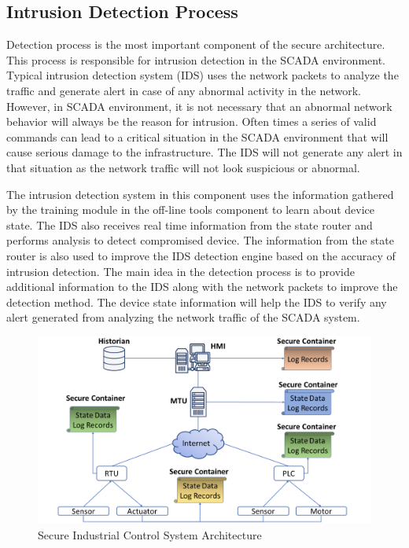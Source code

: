 \documentclass[conference]{IEEEtran}
\begin{document}
\subsection{Intrusion Detection Process}
Detection process is the most important component of the secure architecture. This process is responsible for intrusion detection in the SCADA environment. Typical intrusion detection system (IDS) uses the network packets to analyze the traffic and generate alert in case of any abnormal activity in the network. However, in SCADA environment, it is not necessary that an abnormal network behavior will always be the reason for intrusion. Often times a series of valid commands can lead to a critical situation in the SCADA environment that will cause serious damage to the infrastructure. The IDS will not generate any alert in that situation as the network traffic will not look suspicious or abnormal.
\par The intrusion detection system in this component uses the information gathered by the training module in the off-line tools component to learn about device state. The IDS also receives real time information from the state router and performs analysis to detect compromised device. The information from the state router is also used to improve the IDS detection engine based on the accuracy of intrusion detection. The main idea in the detection process is to provide additional information to the IDS along with the network packets to improve the detection method. The device state information will help the IDS to verify any alert generated from analyzing the network traffic of the SCADA system.  
\begin{figure}[htbp]
\centering
\centerline{\includegraphics [width=.5\textwidth]{sec_arch.png}}
\caption{Secure Industrial Control System Architecture}
\label{fig}
%
\end{figure}
\end{document}
